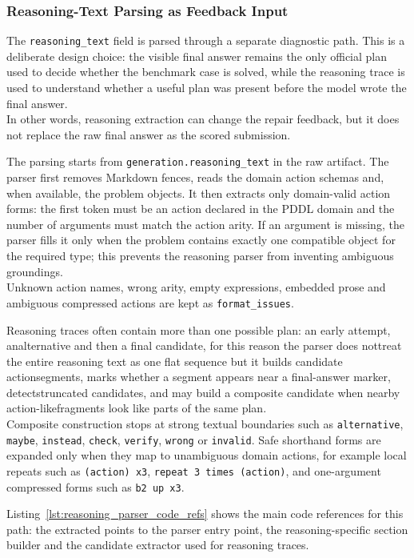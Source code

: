 \subsubsection{Reasoning-Text Parsing as Feedback Input}

The \texttt{reasoning\_text} field is parsed through a separate diagnostic path.
This is a deliberate design choice: the visible final answer remains the only
official plan used to decide whether the benchmark case is solved, while the
reasoning trace is used to understand whether a useful plan was present before
the model wrote the final answer.\\
In other words, reasoning extraction can change the repair feedback, but it does not replace the raw final answer as the scored
submission.

The parsing starts from \texttt{generation.reasoning\_text} in the raw artifact.
The parser first removes Markdown fences, reads the domain action schemas and,
when available, the problem objects. It then extracts only domain-valid action
forms: the first token must be an action declared in the PDDL domain and the
number of arguments must match the action arity. If an argument is missing, the
parser fills it only when the problem contains exactly one compatible object for
the required type; this prevents the reasoning parser from inventing ambiguous
groundings.\\
Unknown action names, wrong arity, empty expressions, embedded prose and ambiguous compressed actions are kept as \texttt{format\_issues}.

Reasoning traces often contain more than one possible plan: an early attempt, analternative and then a final candidate, for this reason the parser does nottreat the entire reasoning text as one flat sequence but it builds candidate actionsegments, marks whether a segment appears near a final-answer marker, detectstruncated candidates, and may build a composite candidate when nearby action-likefragments look like parts of the same plan.\\
Composite construction stops at strong textual boundaries such as \texttt{alternative}, \texttt{maybe}, \texttt{instead}, \texttt{check}, \texttt{verify}, \texttt{wrong} or \texttt{invalid}. Safe shorthand forms are expanded only when they map to
unambiguous domain actions, for example local repeats such as \texttt{(action) x3}, \texttt{repeat 3 times (action)}, and one-argument compressed forms such as \texttt{b2 up x3}.

Listing~\ref{lst:reasoning_parser_code_refs} shows the main code references for this path: the extracted points to the parser entry point, the reasoning-specific section builder and the candidate extractor used for reasoning traces.

